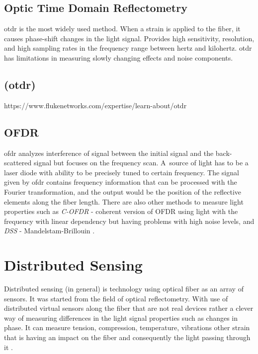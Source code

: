 \subsection{Optic Time Domain Reflectometry}\label{txt.reflectometry.otdr}

\ac{otdr} is the most widely used method. When a strain is applied to the fiber, it causes phase-shift changes in the light signal. Provides high sensitivity, resolution, and high sampling rates in the frequency range between hertz and kilohertz. \ac{otdr} has limitations in measuring slowly changing effects and noise components.

\subsection{(\acs{otdr})}   %

https://www.flukenetworks.com/expertise/learn-about/otdr


\subsection{OFDR}\label{txt.reflectometry.ofdr}

\ac{ofdr} analyzes interference of signal between the initial signal and the back-scattered signal but focuses on the frequency scan. A~source of light has to be a laser diode with ability to be precisely tuned to certain frequency. The signal given by \ac{ofdr} contains frequency information that can be processed with the Fourier transformation, and the output would be the position of the reflective elements along the fiber length. There are also other methods to measure light properties such as \textit{C-OFDR} - coherent version of OFDR using light with the frequency with linear dependency but having problems with high noise levels, and \textit{DSS} - Mandelstam-Brillouin \cite{kislov_das_newparadigm}.

\section{Distributed Sensing}\label{txt.distributed}

Distributed sensing (in general) is technology using optical fiber as an array of sensors. It was started from the field of optical reflectometry. With use of distributed virtual sensors along the fiber that are not real devices rather a clever way of measuring differences in the light signal properties such as changes in phase. It can measure tension, compression, temperature, vibrations other strain that is having an impact on the fiber and consequently the light passing through it \cite{dasKislov}.

